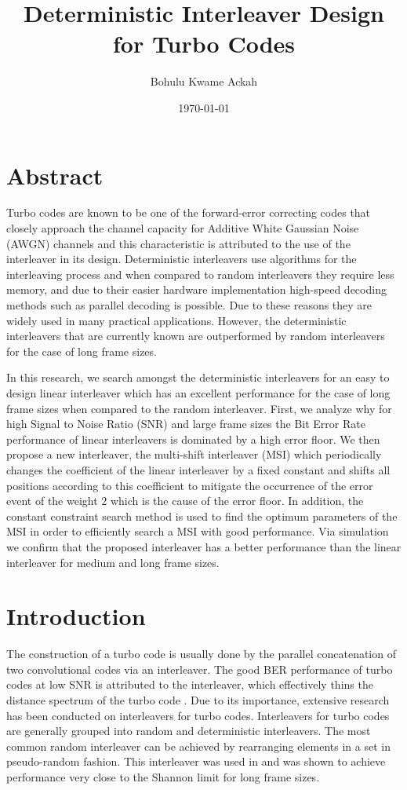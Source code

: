 \documentclass[a4paper, 12pt, oneside, openary]{jbook}
\begin{document}
\title{Deterministic Interleaver Design for Turbo Codes}
\author{Bohulu Kwame Ackah}
\date{\today}
\maketitle

\chapter*{Abstract}
Turbo codes are known to be one of the forward-error correcting codes that closely approach the channel capacity for Additive White Gaussian Noise (AWGN) channels and this characteristic is attributed to the use of the interleaver in its design. Deterministic interleavers use algorithms for the interleaving process and when compared to random interleavers they require less memory, and due to their easier hardware implementation high-speed decoding methods such as parallel decoding is possible. Due to these reasons they are widely used in many practical applications. 
However,  the deterministic interleavers that are currently known are outperformed by random interleavers for the case of long frame sizes.

In this research, we search amongst the deterministic interleavers for an easy to design linear interleaver which has an excellent performance for the case of long frame sizes when compared to the random interleaver. First, we analyze why for high Signal to Noise Ratio (SNR) and large frame sizes the Bit Error Rate performance of linear interleavers is dominated by a high error floor. We then propose a new interleaver, the multi-shift interleaver (MSI) which periodically changes the coefficient of the linear interleaver by a fixed constant and shifts all positions according to this coefficient to mitigate the occurrence of the error event of the weight $ 2 $ which is the cause of the error floor. In addition,  the constant constraint search method is used to find the optimum parameters of the MSI in order to efficiently search a MSI with good performance. Via simulation we confirm that the proposed interleaver has a better performance than the  linear interleaver for medium and long frame sizes. 
\tableofcontents
\chapter{Introduction}
The construction of a turbo code is usually done by the parallel concatenation of two
convolutional codes via an interleaver. The good BER performance of turbo codes at
low SNR  is attributed to the interleaver, which effectively thins the distance spectrum
of the turbo code \cite{ref3}. Due to its importance, extensive research has
been conducted on interleavers for turbo codes. Interleavers for turbo codes are 
generally grouped into random and deterministic interleavers. The most common 
random interleaver can be achieved by rearranging elements in a set in
pseudo-random fashion. This interleaver was used in \cite{ref4} and 
was shown to achieve performance very close to the Shannon limit for long frame 
sizes. 
\end{document}
